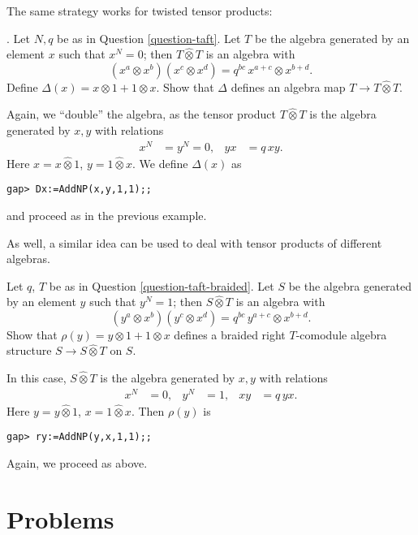 \medskip

The same strategy works for twisted tensor products:

\begin{question}\label{question-taft-braided}. Let $N,q$ be as in Question \ref{question-taft}. 
	Let $T$ be the algebra generated by an element $x$ such that $x^N=0$; then $T\hat{\otimes} T$ is an algebra with 
	\[
	(x^a\otimes x^b)(x^c\otimes x^d)=q^{bc}\,x^{a+c}\otimes x^{b+d}.
	\] Define $\Delta(x)=x\otimes 1+1\otimes x$. Show that $\Delta$ defines an algebra map $T\to T\hat{\otimes} T$.
\end{question}
Again, we ``double'' the algebra, as the tensor product $T\hat{\otimes} T$ is the algebra generated by $x,y$ with relations
\begin{align*}
x^N&=y^N=0, & yx&=q\,xy.
\end{align*}
Here $x=x\hat{\otimes} 1$, $y=1\hat{\otimes}x$. We define $\Delta(x)$ as
\begin{lstlisting}
gap> Dx:=AddNP(x,y,1,1);;
\end{lstlisting}
and proceed as in the previous example.

\medskip

As well, a similar idea can be used to deal with tensor products of different algebras.
\begin{question}
 Let $q$, $T$ be as in Question \ref{question-taft-braided}. Let $S$ be the algebra generated by an element $y$ such that $y^N=1$; then $S\hat{\otimes} T$ is an algebra with 
	\[
	(y^a\otimes x^b)(y^c\otimes x^d)=q^{bc}\,y^{a+c}\otimes x^{b+d}.
	\] 
	Show that $\rho(y)=y\otimes 1+1\otimes x$ defines a braided right $T$-comodule algebra structure $S\to S\hat{\otimes} T$ on $S$. 
\end{question}
In this case, $S\hat{\otimes} T$ is the algebra generated by $x,y$ with relations
\begin{align*}
x^N&=0, & y^N&=1, & xy&=q\,yx.
\end{align*}
Here $y=y\hat{\otimes} 1$, $x=1\hat{\otimes}x$. Then $\rho(y)$ is
\begin{lstlisting}
gap> ry:=AddNP(y,x,1,1);;
\end{lstlisting}
Again, we proceed as above.





\section{Problems}


